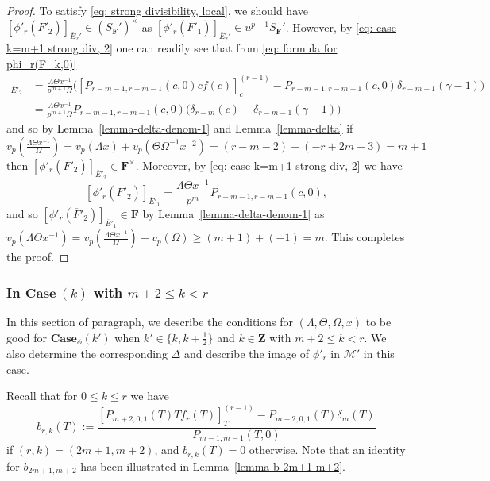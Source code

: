 \documentclass[11pt]{amsart}
\theoremstyle{definition}
\numberwithin{equation}{subsection}
\theoremstyle{plain}
\theoremstyle{plain}
\theoremstyle{plain}
\theoremstyle{plain}
\theoremstyle{plain}
\theoremstyle{plain}
\theoremstyle{plain}
\theoremstyle{plain}
\theoremstyle{plain}
\theoremstyle{plain}
\theoremstyle{plain}
\theoremstyle{plain}
\theoremstyle{definition}
\theoremstyle{definition}
\theoremstyle{definition}
\theoremstyle{remark}
\renewcommand{\(}{\textup{(}}
\renewcommand{\)}{\textup{)}}
\newcommand{\Z}{\mathbf{Z}}
\newcommand{\F}{\mathbf{F}}
\newcommand{\barS}{\overline{S}}
\newcommand{\cM}{\mathcal{M}}
\newcommand{\barE}{\overline{E}}
\newcommand{\barF}{\overline{F}}
\begin{document}
\begin{proof}
To satisfy \eqref{eq: strong divisibility, local}, we should have $[\phi'_r(\barF'_2)]_{\barE_2'}\in (\barS_\F')^\times$ as $[\phi'_r(\barF'_1)]_{\barE_2'}\in u^{p-1}\barS_\F'$. However, by \eqref{eq: case k=m+1 strong div, 2} one can readily see that from \eqref{eq: formula for phi_r(F_k,0)}
\begin{align*}
[\phi'_r(\barF'_2)]_{\barE'_2}& =\frac{\Lambda\Theta x^{-1}}{p^{m+1}\Omega} \big([P_{r-m-1,r-m-1}(c,0)cf(c)]_c^{(r-1)}-P_{r-m-1,r-m-1}(c,0)\delta_{r-m-1}(\gamma-1)\big)\\
&=\frac{\Lambda\Theta x^{-1}}{p^{m+1}\Omega} P_{r-m-1,r-m-1}(c,0)\big(\delta_{r-m}(c)-\delta_{r-m-1}(\gamma-1)\big)
\end{align*}
and so by Lemma~\ref{lemma-delta-denom-1} and Lemma~\ref{lemma-delta} if $v_p(\frac{\Lambda\Theta x^{-1}}{\Omega})=v_p(\Lambda x)+v_p(\Theta\Omega^{-1}x^{-2})=(r-m-2)+(-r+2m+3)=m+1$ then $[\phi'_r(\barF'_2)]_{\barE'_2}\in\F^{\times}$. Moreover, by \eqref{eq: case k=m+1 strong div, 2} we have $$[\phi'_r(\barF'_{2})]_{\barE'_1}=\frac{\Lambda \Theta x^{-1}}{p^{m}}P_{r-m-1,r-m-1}(c,0),$$ and so $[\phi'_r(\barF'_{2})]_{\barE'_1}\in\F$ by Lemma~\ref{lemma-delta-denom-1} as $v_p(\Lambda\Theta x^{-1})=v_p(\frac{\Lambda\Theta x^{-1}}{\Omega})+v_p(\Omega)\geq (m+1)+(-1)=m$. This completes the proof.
\end{proof}




\subsubsection{\textbf{In $\mathbf{Case}~(k)$ with $m+2\leq k<r$}}
In this section of paragraph, we describe the conditions for $(\Lambda,\Theta,\Omega,x)$ to be good for $\mathbf{Case}_\phi(k')$ when $k'\in\{k,k+\frac{1}{2}\}$ and $k\in\Z$ with $m+2\leq k< r$. We also determine the corresponding $\Delta$ and describe the image of $\phi'_r$ in $\cM'$ in this case.

Recall that for $0\leq k\leq r$ we have
\begin{equation*}
b_{r,k}(T):=\frac{[P_{m+2,0,1}(T)Tf_r(T)]_{T}^{(r-1)} -P_{m+2,0,1}(T)\delta_m(T)}{P_{m-1,m-1}(T,0)}
\end{equation*}
if $(r,k)=(2m+1,m+2)$, and $b_{r,k}(T)=0$ otherwise. Note that an identity for $b_{2m+1,m+2}$ has been illustrated in Lemma~\ref{lemma-b-2m+1-m+2}.
\end{document}
